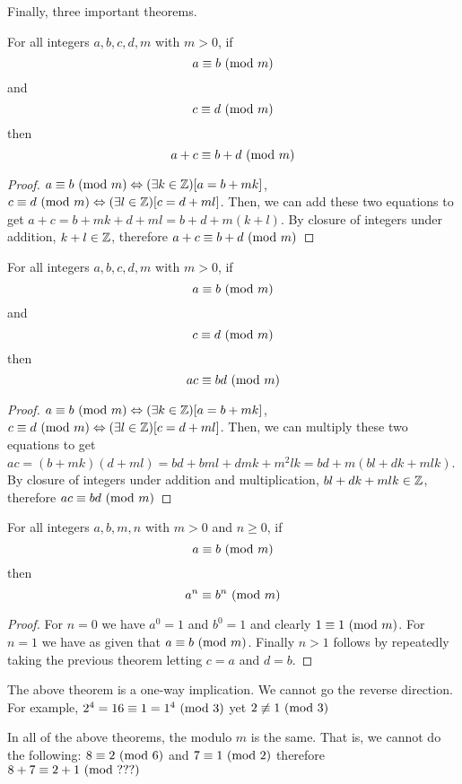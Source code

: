 \documentclass[main.tex]{subfiles}
\begin{document}
Finally, three important theorems.

\begin{thm}
	For all integers \(a,b,c,d,m\) with \(m > 0\), if \[a \equiv b \ (\mathrm{mod}\ m)\] and \[c \equiv d \ (\mathrm{mod}\ m)\] then \[a+c \equiv b+d \ (\mathrm{mod}\ m)\]
\end{thm}

\begin{proof}
	\(a \equiv b \ (\mathrm{mod}\ m) \Leftrightarrow (\exists k \in \mathbb{Z})[a = b + mk]\), \(c \equiv d \ (\mathrm{mod}\ m) \Leftrightarrow (\exists l \in \mathbb{Z})[c = d + ml]\). Then, we can add these two equations to get \(a+c = b + mk + d + ml = b+d + m(k+l)\). By closure of integers under addition, \(k+l \in \mathbb{Z}\), therefore \(a+c \equiv b+d \ (\mathrm{mod}\ m)\)
\end{proof}

\begin{thm}
	For all integers \(a,b,c,d,m\) with \(m > 0\), if \[a \equiv b \ (\mathrm{mod}\ m)\] and \[c \equiv d \ (\mathrm{mod}\ m)\] then \[ac \equiv bd \ (\mathrm{mod}\ m)\]
\end{thm}

\begin{proof}
	\(a \equiv b \ (\mathrm{mod}\ m) \Leftrightarrow (\exists k \in \mathbb{Z})[a = b + mk]\), \(c \equiv d \ (\mathrm{mod}\ m) \Leftrightarrow (\exists l \in \mathbb{Z})[c = d + ml]\). Then, we can multiply these two equations to get \(ac = (b + mk)(d + ml) = bd + bml + dmk + m^2lk = bd + m(bl + dk + mlk)\). By closure of integers under addition and multiplication, \(bl + dk + mlk \in \mathbb{Z}\), therefore \(ac \equiv bd \ (\mathrm{mod}\ m)\)
\end{proof}

\begin{thm}
	For all integers \(a,b,m,n\) with \(m > 0\) and \(n \geq 0\), if \[a \equiv b \ (\mathrm{mod}\ m)\] then \[a^n \equiv b^n \ (\mathrm{mod}\ m)\]
\end{thm}

\begin{proof}
	For \(n = 0\) we have \(a^0 = 1\) and \(b^0 = 1\) and clearly \(1 \equiv 1 \ (\mathrm{mod}\ m)\). For \(n = 1\) we have as given that \(a \equiv b \ (\mathrm{mod}\ m)\). Finally \(n > 1\) follows by repeatedly taking the previous theorem letting \(c = a\) and \(d = b\).
\end{proof}

\begin{rem}
	The above theorem is a one-way implication. We cannot go the reverse direction. For example, \(2^4 = 16 \equiv 1 = 1^4 \ (\mathrm{mod}\ 3)\) yet \(2 \not\equiv 1 \ (\mathrm{mod}\ 3)\)
\end{rem}

\begin{rem}
	In all of the above theorems, the modulo \(m\) is the same. That is, we cannot do the following: \(8 \equiv 2 \ (\mathrm{mod}\ 6)\) and \(7 \equiv 1 \ (\mathrm{mod}\ 2)\) therefore \(8+7 \equiv 2+1 \ (\mathrm{mod}\ ???)\)
\end{rem}
\end{document}
